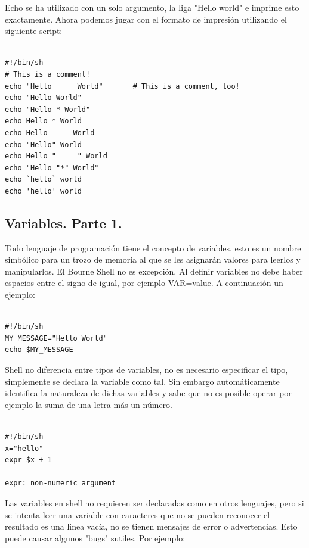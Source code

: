 \documentclass{article} %
\begin{document}
Echo se ha utilizado con un solo argumento, la liga "Hello world" e imprime esto exactamente. Ahora podemos jugar con el formato de impresión utilizando el siguiente script:

\begin{verbatim} 

#!/bin/sh
# This is a comment!
echo "Hello      World"       # This is a comment, too!
echo "Hello World"
echo "Hello * World"
echo Hello * World
echo Hello      World
echo "Hello" World
echo Hello "     " World
echo "Hello "*" World"
echo `hello` world
echo 'hello' world

\end{verbatim}

\subsection{Variables. Parte 1.}

Todo lenguaje de programación tiene el concepto de variables, esto es un nombre simbólico para un trozo de memoria al que se les asignarán valores para leerlos y manipularlos. El Bourne Shell no es excepción. Al definir variables no debe haber espacios entre el signo de igual, por ejemplo VAR=value. A continuación un ejemplo:

\begin{verbatim} 

#!/bin/sh
MY_MESSAGE="Hello World"
echo $MY_MESSAGE

\end{verbatim}

Shell no diferencia entre tipos de variables, no es necesario especificar el tipo, simplemente se declara la variable como tal. Sin embargo automáticamente identifica la naturaleza de dichas variables y sabe que no es posible operar por ejemplo la suma de una letra más un número.

\begin{verbatim} 

#!/bin/sh
x="hello"
expr $x + 1

expr: non-numeric argument

\end{verbatim}

Las variables en shell no requieren ser declaradas como en otros lenguajes, pero si se intenta leer una variable con caracteres que no se pueden reconocer el resultado es una linea vacía, no se tienen mensajes de error o advertencias. Esto puede causar algunos "bugs" sutiles. Por ejemplo:
\end{document}
